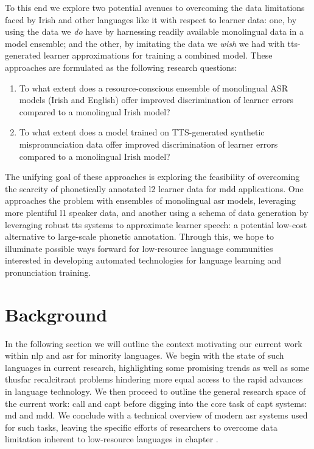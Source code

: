 \documentclass[thesis]{cluu}
\begin{document}
To this end we explore two potential avenues to overcoming the data limitations faced by Irish and other languages like it with respect to learner data: one, by using the data we \textit{do} have by harnessing readily available monolingual data in a model ensemble; and the other, by imitating the data we \textit{wish} we had with \gls{tts}-generated learner approximations for training a combined model. These approaches are formulated as the following research questions:
\begin{enumerate}
  \item To what extent does a resource-conscious ensemble of monolingual ASR models (Irish and English) offer improved discrimination of learner errors compared to a monolingual Irish model?\label{rq:1}
  \item To what extent does a model trained on TTS-generated synthetic mispronunciation data offer improved discrimination of learner errors compared to a monolingual Irish model?\label{rq:2}
\end{enumerate}

The unifying goal of these approaches is exploring the feasibility of overcoming the scarcity of phonetically annotated \gls{l2} learner data for \gls{mdd} applications. One approaches the problem with ensembles of monolingual \gls{asr} models, leveraging more plentiful \gls{l1} speaker data, and another using a schema of data generation by leveraging robust \gls{tts} systems to approximate learner speech: a potential low-cost alternative to large-scale phonetic annotation. Through this, we hope to illuminate possible ways forward for low-resource language communities interested in developing automated technologies for language learning and pronunciation training.

\chapter{Background}\label{background}

In the following section we will outline the context motivating our current work within \gls{nlp} and \gls{asr} for minority languages. We begin with the state of such languages in current research, highlighting some promising trends as well as some thusfar recalcitrant problems hindering more equal access to the rapid advances in language technology. We then proceed to outline the general research space of the current work: \gls{call} and \gls{capt} before digging into the core task of \gls{capt} systems: \gls{md} and \gls{mdd}. We conclude with a technical overview of modern \gls{asr} systems used for such tasks, leaving the specific efforts of researchers to overcome data limitation inherent to low-resource languages in chapter .
\end{document}

